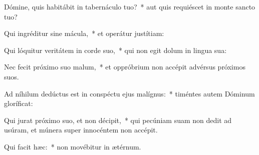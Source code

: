 \item Dómine, quis habitábit in tabernáculo tuo?~* aut quis requiéscet in monte sancto tuo?

\item Qui ingréditur sine mácula,~* et operátur justítiam:

\item Qui lóquitur veritátem in corde suo,~* qui non egit dolum in lingua sua:

\item Nec fecit próximo suo malum,~* et oppróbrium non accépit advérsus próximos suos.

\item Ad níhilum dedúctus est in conspéctu ejus malígnus:~* timéntes autem Dóminum gloríficat:

\item Qui jurat próximo suo, et non décipit,~* qui pecúniam suam non dedit ad usúram, et múnera super innocéntem non accépit.

\item Qui facit hæc:~* non movébitur in ætérnum.

